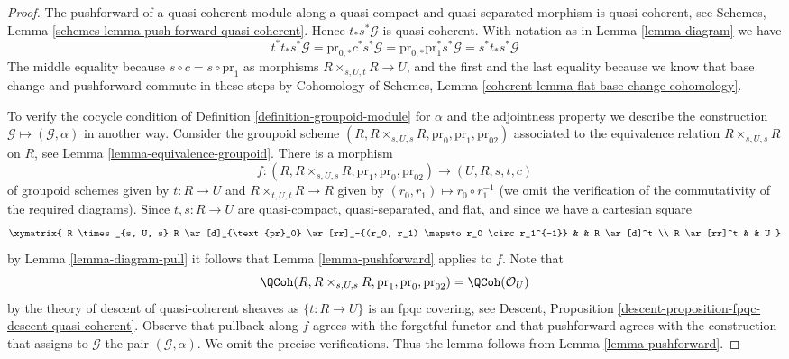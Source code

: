 \begin{proof}
The pushforward of a quasi-coherent module along a quasi-compact and
quasi-separated morphism is quasi-coherent, see Schemes, Lemma
\ref{schemes-lemma-push-forward-quasi-coherent}. Hence $t_*s^*\mathcal{G}$
is quasi-coherent. With notation as in Lemma \ref{lemma-diagram} we have
$$
t^*t_*s^*\mathcal{G} =
\text{pr}_{0, *}c^* s^*\mathcal{G} =
\text{pr}_{0, *}\text{pr}_1^*s^*\mathcal{G} =
s^*t_*s^*\mathcal{G}
$$
The middle equality because $s \circ c = s \circ \text{pr}_1$ as
morphisms $R \times_{s, U, t} R \to U$, and the first and the last
equality because we know that base change and pushforward commute in
these steps by Cohomology of Schemes, Lemma
\ref{coherent-lemma-flat-base-change-cohomology}.

\medskip\noindent
To verify the cocycle condition of Definition \ref{definition-groupoid-module}
for $\alpha$ and the adjointness property we describe the construction
$\mathcal{G} \mapsto (\mathcal{G}, \alpha)$ in another way.
Consider the groupoid scheme
$(R, R \times_{s, U, s} R, \text{pr}_0, \text{pr}_1, \text{pr}_{02})$
associated to the equivalence relation $R \times_{s, U, s} R$
on $R$, see Lemma \ref{lemma-equivalence-groupoid}.
There is a morphism
$$
f :
(R, R \times_{s, U, s} R, \text{pr}_1, \text{pr}_0, \text{pr}_{02})
\longrightarrow
(U, R, s, t, c)
$$
of groupoid schemes given by $t : R \to U$ and $R \times_{t, U, t} R \to R$
given by $(r_0, r_1) \mapsto r_0 \circ r_1^{-1}$ (we omit the verification
of the commutativity of the required diagrams). Since
$t, s : R \to U$ are quasi-compact, quasi-separated, and flat,
and since we have a cartesian square
$$
\xymatrix{
R \times_{s, U, s} R \ar[d]_{\text{pr}_0}
\ar[rr]_-{(r_0, r_1) \mapsto r_0 \circ r_1^{-1}} & & R \ar[d]^t \\
R \ar[rr]^t & & U
}
$$
by Lemma \ref{lemma-diagram-pull} it follows that
Lemma \ref{lemma-pushforward} applies to $f$. Note that
$$
\QCoh(R, R \times_{s, U, s} R, \text{pr}_1, \text{pr}_0, \text{pr}_{02})
= \QCoh(\mathcal{O}_U)
$$
by the theory of descent of quasi-coherent sheaves as $\{t : R \to U\}$
is an fpqc covering, see
Descent, Proposition \ref{descent-proposition-fpqc-descent-quasi-coherent}.
Observe that pullback along $f$ agrees with the forgetful functor and
that pushforward agrees with the construction that assigns to
$\mathcal{G}$ the pair $(\mathcal{G}, \alpha)$. We omit the precise
verifications. Thus the lemma follows from Lemma \ref{lemma-pushforward}.
\end{proof}


